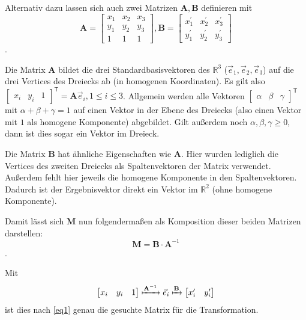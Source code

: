 \documentclass{whswinvcbook}
\begin{document}
Alternativ dazu lassen sich auch zwei Matrizen $\mathbf{A},\mathbf{B}$ definieren mit $$\mathbf{A}=\begin{bmatrix}x_1&x_2&x_3\\y_1&y_2&y_3\\1&1&1\end{bmatrix},\mathbf{B}=\begin{bmatrix}x_1^\prime&x_2^\prime&x_3^\prime\\y_1^\prime&y_2^\prime&y_3^\prime\end{bmatrix}$$.

Die Matrix $\mathbf{A}$ bildet die drei Standardbasisvektoren des $\mathbb{R}^3$ ($\vec{e}_1,\vec{e}_2,\vec{e}_3$) auf die drei Vertices des Dreiecks ab (in homogenen Koordinaten). Es gilt also $\begin{bmatrix}x_i&y_i&1\end{bmatrix}^\mathsf{T}=\mathbf{A}\vec{e}_i,1\leq i\leq3$. Allgemein werden alle Vektoren $\begin{bmatrix}\alpha&\beta&\gamma\end{bmatrix}^\mathsf{T}$ mit $\alpha+\beta+\gamma=1$ auf einen Vektor in der Ebene des Dreiecks (also einen Vektor mit $1$ als homogene Komponente) abgebildet. Gilt außerdem noch $\alpha,\beta,\gamma\geq0$, dann ist dies sogar ein Vektor im Dreieck.

Die Matrix $\mathbf{B}$ hat ähnliche Eigenschaften wie $\mathbf{A}$. Hier wurden lediglich die Vertices des zweiten Dreiecks als Spaltenvektoren der Matrix verwendet. Außerdem fehlt hier jeweils die homogene Komponente in den Spaltenvektoren. Dadurch ist der Ergebnisvektor direkt ein Vektor im $\mathbb{R}^2$ (ohne homogene Komponente).

Damit lässt sich $\mathbf{M}$ nun folgendermaßen als Komposition dieser beiden Matrizen darstellen:$$\mathbf{M}=\mathbf{B}\cdot\mathbf{A}^{-1}$$.

Mit $$\begin{bmatrix}x_i&y_i&1\end{bmatrix}\xmapsto{\mathbf{A}^{-1}}\vec{e}_i\xmapsto{\mathbf{B}}\begin{bmatrix}x_i^\prime&y_i^\prime\end{bmatrix}$$ ist dies nach \ref{eq1} genau die gesuchte Matrix für die Transformation.
\end{document}
